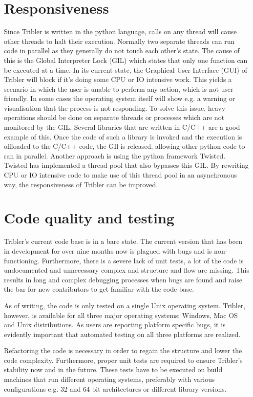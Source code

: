 \section{Responsiveness}
Since Tribler is written in the python language, calls on any thread will cause other threads to halt their execution.
Normally two separate threads can run code in parallel as they generally do not touch each other's state.
The cause of this is the Global Interpreter Lock (GIL) which states that only one function can be executed at a time.
In its current state, the Graphical User Interface (GUI) of Tribler will block if it's doing some CPU or IO intensive work.
This yields a scenario in which the user is unable to perform any action, which is not user friendly.
In some cases the operating system itself will show e.g. a warning or visualisation that the process is not responding.
To solve this issue, heavy operations should be done on separate threads or processes which are not monitored by the GIL.
Several libraries that are written in C/C++ are a good example of this.
Once the code of such a library is invoked and the execution is offloaded to the C/C++ code, the GIl is released, allowing other python code to ran in parallel.
Another approach is using the python framework Twisted.
Twisted has implemented a thread pool that also bypasses this GIL.
By rewriting CPU or IO intensive code to make use of this thread pool in an asynchronous way, the responsiveness of Tribler can be improved.

\section{Code quality and testing}
Tribler's current code base is in a bare state.
The current version that has been in development for over nine months now is plagued with bugs and is non-functioning.
Furthermore, there is a severe lack of unit tests, a lot of the code is undocumented and unnecessary complex and structure and flow are missing.
This results in long and complex debugging processes when bugs are found and raise the bar for new contributors to get familiar with the code base.

As of writing, the code is only tested on a single Unix operating system.
Tribler, however, is available for all three major operating systems: Windows, Mac OS and Unix distributions.
As users are reporting platform specific bugs, it is evidently important that automated testing on all three platforms are realized.

Refactoring the code is necessary in order to regain the structure and lower the code complexity.
Furthermore, proper unit tests are required to ensure Tribler's stability now and in the future.
These tests have to be executed on build machines that run different operating systems, preferably with various configurations e.g. 32 and 64 bit architectures or different library versions.
